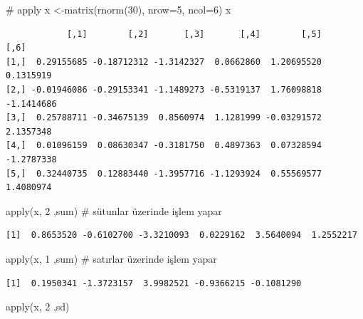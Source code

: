\documentclass[
  letterpaper,
  DIV=11,
  numbers=noendperiod]{scrreprt}
\newenvironment{Shaded}{\begin{snugshade}}{\end{snugshade}}
\newcommand{\AttributeTok}[1]{\textcolor[rgb]{0.40,0.45,0.13}{#1}}
\newcommand{\CommentTok}[1]{\textcolor[rgb]{0.37,0.37,0.37}{#1}}
\newcommand{\DecValTok}[1]{\textcolor[rgb]{0.68,0.00,0.00}{#1}}
\newcommand{\FunctionTok}[1]{\textcolor[rgb]{0.28,0.35,0.67}{#1}}
\newcommand{\NormalTok}[1]{\textcolor[rgb]{0.00,0.23,0.31}{#1}}
\newcommand{\OtherTok}[1]{\textcolor[rgb]{0.00,0.23,0.31}{#1}}
\begin{document}
\begin{Shaded}
\begin{Highlighting}[]
\CommentTok{\# apply}
\NormalTok{x }\OtherTok{\textless{}{-}}\FunctionTok{matrix}\NormalTok{(}\FunctionTok{rnorm}\NormalTok{(}\DecValTok{30}\NormalTok{), }\AttributeTok{nrow=}\DecValTok{5}\NormalTok{, }\AttributeTok{ncol=}\DecValTok{6}\NormalTok{)}
\NormalTok{x}
\end{Highlighting}
\end{Shaded}

\begin{verbatim}
            [,1]        [,2]       [,3]       [,4]        [,5]       [,6]
[1,]  0.29155685 -0.18712312 -1.3142327  0.0662860  1.20695520  0.1315919
[2,] -0.01946086 -0.29153341 -1.1489273 -0.5319137  1.76098818 -1.1414686
[3,]  0.25788711 -0.34675139  0.8560974  1.1281999 -0.03291572  2.1357348
[4,]  0.01096159  0.08630347 -0.3181750  0.4897363  0.07328594 -1.2787338
[5,]  0.32440735  0.12883440 -1.3957716 -1.1293924  0.55569577  1.4080974
\end{verbatim}

\begin{Shaded}
\begin{Highlighting}[]
\FunctionTok{apply}\NormalTok{(x, }\DecValTok{2}\NormalTok{ ,sum) }\CommentTok{\# sütunlar üzerinde işlem yapar}
\end{Highlighting}
\end{Shaded}

\begin{verbatim}
[1]  0.8653520 -0.6102700 -3.3210093  0.0229162  3.5640094  1.2552217
\end{verbatim}

\begin{Shaded}
\begin{Highlighting}[]
\FunctionTok{apply}\NormalTok{(x, }\DecValTok{1}\NormalTok{ ,sum) }\CommentTok{\# satırlar üzerinde işlem yapar}
\end{Highlighting}
\end{Shaded}

\begin{verbatim}
[1]  0.1950341 -1.3723157  3.9982521 -0.9366215 -0.1081290
\end{verbatim}

\begin{Shaded}
\begin{Highlighting}[]
\FunctionTok{apply}\NormalTok{(x, }\DecValTok{2}\NormalTok{ ,sd)}
\end{Highlighting}
\end{Shaded}
\end{document}
